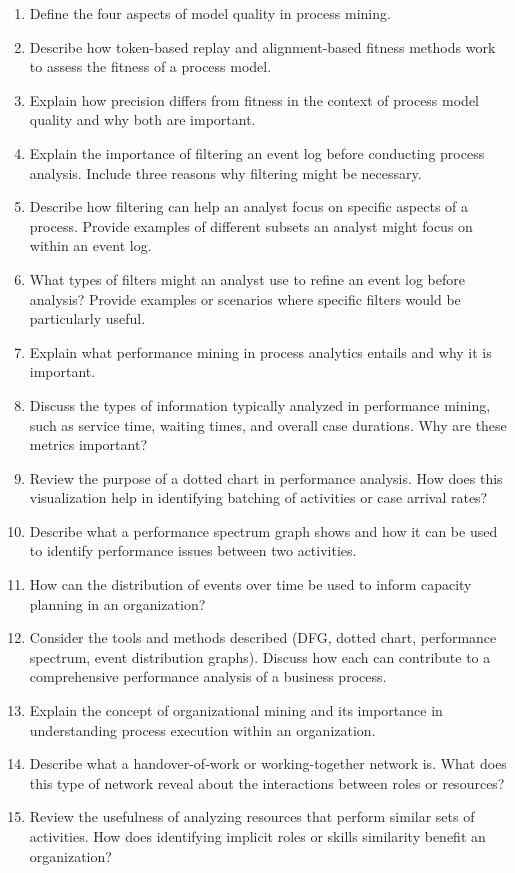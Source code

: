 \begin{withcode}
\begin{enumerate}
    \item Define the four aspects of model quality in process mining.
    \item Describe how token-based replay and alignment-based fitness methods work to assess the fitness of a process model.
    \item Explain how precision differs from fitness in the context of process model quality and why both are important.
    \item Explain the importance of filtering an event log before conducting process analysis. Include three reasons why filtering might be necessary.
    \item Describe how filtering can help an analyst focus on specific aspects of a process. Provide examples of different subsets an analyst might focus on within an event log.
    \item What types of filters might an analyst use to refine an event log before analysis? Provide examples or scenarios where specific filters would be particularly useful.
    \item Explain what performance mining in process analytics entails and why it is important.
    \item Discuss the types of information typically analyzed in performance mining, such as service time, waiting times, and overall case durations. Why are these metrics important?
    \item Review the purpose of a dotted chart in performance analysis. How does this visualization help in identifying batching of activities or case arrival rates?
    \item Describe what a performance spectrum graph shows and how it can be used to identify performance issues between two activities.
    \item How can the distribution of events over time be used to inform capacity planning in an organization?
    \item Consider the tools and methods described (DFG, dotted chart, performance spectrum, event distribution graphs). Discuss how each can contribute to a comprehensive performance analysis of a business process.
    \item Explain the concept of organizational mining and its importance in understanding process execution within an organization.
    \item Describe what a handover-of-work or working-together network is. What does this type of network reveal about the interactions between roles or resources?
    \item Review the usefulness of analyzing resources that perform similar sets of activities. How does identifying implicit roles or skills similarity benefit an organization?
\end{enumerate}
\end{withcode}
